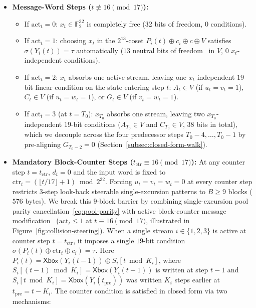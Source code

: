 \documentclass[11pt,a4paper]{article}
\theoremstyle{definition}
\theoremstyle{remark}
\newcommand{\Ftwo}{\mathbb{F}_2}
\newcommand{\Xbox}{\mathsf{Xbox}}
\begin{document}
\begin{itemize}[leftmargin=2em]
    \item \textbf{Message-Word Steps ($t \not\equiv 16 \pmod{17}$):}
    \begin{itemize}
        \item If $\mathrm{act}_t = 0$: $x_t \in \Ftwo^{32}$ is completely free ($32$ bits of freedom, $0$ conditions).
        \item If $\mathrm{act}_t = 1$: choosing $x_t$ in the $2^{13}$-coset $P_i(t) \oplus c_i \oplus c \oplus V$ satisfies $\sigma(Y_i(t)) = \tau$ automatically ($13$ neutral bits of freedom~\cite{BC04} in $V$, $0$ $x_t$-independent conditions).
        \item If $\mathrm{act}_t = 2$: $x_t$ absorbs one active stream, leaving one $x_t$-independent $19$-bit linear condition on the state entering step $t$: $A_t \in V$ (if $u_t = v_t = 1$), $C_t \in V$ (if $u_t = w_t = 1$), or $G_t \in V$ (if $v_t = w_t = 1$).
        \item If $\mathrm{act}_t = 3$ (at $t = T_0$): $x_{T_0}$ absorbs one stream, leaving two $x_{T_0}$-independent $19$-bit conditions ($A_{T_0} \in V$ and $C_{T_0} \in V$, $38$ bits in total), which we decouple across the four predecessor steps $T_0 - 4, \dots, T_0 - 1$ by pre-aligning $G_{T_0 - 2} = 0$ (Section~\ref{subsec:closed-form-walk}).
    \end{itemize}
    \item \textbf{Mandatory Block-Counter Steps ($t_{\mathrm{ctr}} \equiv 16 \pmod{17}$):} At any counter step $t = t_{\mathrm{ctr}}$, $d_t = 0$ and the input word is fixed to $\mathrm{ctr}_t = (\lfloor t / 17 \rfloor + 1) \bmod 2^{32}$. Forcing $u_t = v_t = w_t = 0$ at every counter step restricts $3$-step look-back steerable single-excursion patterns to $B \ge 9$ blocks ($576$ bytes). We break this $9$-block barrier by combining single-excursion pool parity cancellation~\eqref{eq:pool-parity} with active block-counter message modification~\cite{WangYu05} ($\mathrm{act}_t \le 1$ at $t \equiv 16 \pmod{17}$, illustrated in Figure~\ref{fig:collision-steering}). When a single stream $i \in \{1, 2, 3\}$ is active at counter step $t = t_{\mathrm{ctr}}$, it imposes a single $19$-bit condition $\sigma(P_i(t) \oplus \mathrm{ctr}_t \oplus c_i) = \tau$. Here $P_i(t) = \Xbox(Y_i(t-1)) \oplus S_i[t \bmod K_i]$, where $S_i[(t-1)\bmod K_i] = \Xbox(Y_i(t-1))$ is written at step $t - 1$ and $S_i[t \bmod K_i] = \Xbox(Y_i(t_{\mathrm{pre}}))$ was written $K_i$ steps earlier at $t_{\mathrm{pre}} = t - K_i$. The counter condition is satisfied in closed form via two mechanisms:

\end{itemize}
\end{document}
